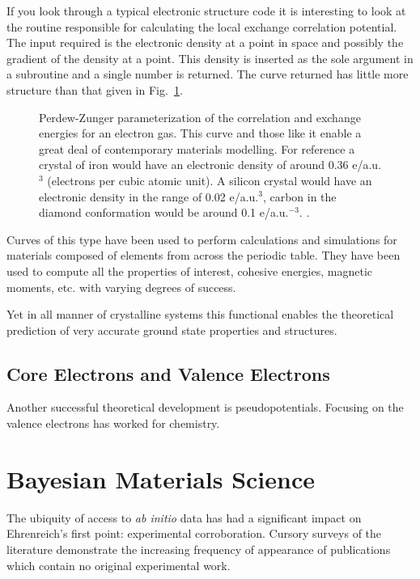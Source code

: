 If you look through a typical electronic structure code it is interesting to look at the routine
responsible for calculating the local exchange correlation potential. The input required is the 
electronic density at a point in space and possibly the gradient of the density at a point. This 
density is inserted as the sole argument in a subroutine and a single number is returned. The curve
returned has little more structure than that given in Fig.~\ref{fig:ldapz}. 
%
\begin{figure}
\begin{center}
\graphicspath{{./intro/}}
\caption{Perdew-Zunger parameterization of the correlation and exchange energies for an electron gas.
This curve and those like it enable a great deal of contemporary materials modelling. For reference
a crystal of iron would have an electronic density of around 0.36 e/a.u.$^{3}$ (electrons per cubic
atomic unit). A silicon crystal would have an electronic density in the range of 0.02 e/a.u.$^{3}$,
carbon in the diamond conformation would be around 0.1 e/a.u.$^{-3}$.  
\label{fig:ldapz}.}
\end{center}
\end{figure}
%
Curves of this type have been used to perform calculations and simulations for 
materials composed of elements from across the periodic table. They have been
used to compute all the properties of interest, cohesive energies, magnetic moments,
etc. with varying degrees of success.

Yet in all manner of crystalline systems this functional enables the theoretical
prediction of very accurate ground state properties and structures. 

\subsection{Core Electrons and Valence Electrons}
Another successful theoretical development is pseudopotentials. Focusing on the valence electrons 
has worked for chemistry.

\section{Bayesian Materials Science}
The ubiquity of access to {\it ab initio} data has had a significant impact on 
Ehrenreich's first point: experimental corroboration. 
Cursory surveys of the literature demonstrate the increasing frequency of 
appearance of publications which contain no original experimental work. 

